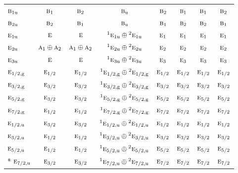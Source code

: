 \documentclass[10pt,a4paper]{article}
\numberwithin{equation}{section}
\newcommand{\irr}[1]{\text{\normalfont\scshape #1}}
\newcommand{\conjpair}[1]{{}^{#1}}
\newcommand{\ptag}[1]{\mathrm{#1}}
\begin{document}
{\begin{longtable}{@{}lccccccc@{}}
$\irr{b}_{1\ptag{u}}$ & $\irr{b}_{1}$ & $\irr{b}_{2}$ & $\irr{b}_{\ptag{u}}$ & $\irr{b}_{2}$ & $\irr{b}_{1}$ & $\irr{b}_{1}$ & $\irr{b}_{2}$\\
$\irr{b}_{2\ptag{u}}$ & $\irr{b}_{2}$ & $\irr{b}_{1}$ & $\irr{b}_{\ptag{u}}$ & $\irr{b}_{1}$ & $\irr{b}_{2}$ & $\irr{b}_{2}$ & $\irr{b}_{1}$\\
$\irr{e}_{1\ptag{u}}$ & $\irr{e}$ & $\irr{e}$ & $\conjpair{1}\irr{e}_{1\ptag{u}}\oplus \conjpair{2}\irr{e}_{1\ptag{u}}$ & $\irr{e}_{1}$ & $\irr{e}_{1}$ & $\irr{e}_{1}$ & $\irr{e}_{1}$\\
$\irr{e}_{2\ptag{u}}$ & $\irr{a}_{1}\oplus \irr{a}_{2}$ & $\irr{a}_{1}\oplus \irr{a}_{2}$ & $\conjpair{1}\irr{e}_{2\ptag{u}}\oplus \conjpair{2}\irr{e}_{2\ptag{u}}$ & $\irr{e}_{2}$ & $\irr{e}_{2}$ & $\irr{e}_{2}$ & $\irr{e}_{2}$\\
$\irr{e}_{3\ptag{u}}$ & $\irr{e}$ & $\irr{e}$ & $\conjpair{1}\irr{e}_{3\ptag{u}}\oplus \conjpair{2}\irr{e}_{3\ptag{u}}$ & $\irr{e}_{3}$ & $\irr{e}_{3}$ & $\irr{e}_{3}$ & $\irr{e}_{3}$\\
$\irr{e}_{1/2,\ptag{g}}$ & $\irr{e}_{1/2}$ & $\irr{e}_{1/2}$ & $\conjpair{1}\irr{e}_{1/2,\ptag{g}}\oplus \conjpair{2}\irr{e}_{1/2,\ptag{g}}$ & $\irr{e}_{1/2}$ & $\irr{e}_{1/2}$ & $\irr{e}_{1/2}$ & $\irr{e}_{1/2}$\\
$\irr{e}_{3/2,\ptag{g}}$ & $\irr{e}_{3/2}$ & $\irr{e}_{3/2}$ & $\conjpair{1}\irr{e}_{3/2,\ptag{g}}\oplus \conjpair{2}\irr{e}_{3/2,\ptag{g}}$ & $\irr{e}_{3/2}$ & $\irr{e}_{3/2}$ & $\irr{e}_{3/2}$ & $\irr{e}_{3/2}$\\
$\irr{e}_{5/2,\ptag{g}}$ & $\irr{e}_{3/2}$ & $\irr{e}_{3/2}$ & $\conjpair{1}\irr{e}_{5/2,\ptag{g}}\oplus \conjpair{2}\irr{e}_{5/2,\ptag{g}}$ & $\irr{e}_{5/2}$ & $\irr{e}_{5/2}$ & $\irr{e}_{5/2}$ & $\irr{e}_{5/2}$\\
$\irr{e}_{7/2,\ptag{g}}$ & $\irr{e}_{1/2}$ & $\irr{e}_{1/2}$ & $\conjpair{1}\irr{e}_{7/2,\ptag{g}}\oplus \conjpair{2}\irr{e}_{7/2,\ptag{g}}$ & $\irr{e}_{7/2}$ & $\irr{e}_{7/2}$ & $\irr{e}_{7/2}$ & $\irr{e}_{7/2}$\\
$\irr{e}_{1/2,\ptag{u}}$ & $\irr{e}_{3/2}$ & $\irr{e}_{3/2}$ & $\conjpair{1}\irr{e}_{1/2,\ptag{u}}\oplus \conjpair{2}\irr{e}_{1/2,\ptag{u}}$ & $\irr{e}_{1/2}$ & $\irr{e}_{1/2}$ & $\irr{e}_{1/2}$ & $\irr{e}_{1/2}$\\
$\irr{e}_{3/2,\ptag{u}}$ & $\irr{e}_{1/2}$ & $\irr{e}_{1/2}$ & $\conjpair{1}\irr{e}_{3/2,\ptag{u}}\oplus \conjpair{2}\irr{e}_{3/2,\ptag{u}}$ & $\irr{e}_{3/2}$ & $\irr{e}_{3/2}$ & $\irr{e}_{3/2}$ & $\irr{e}_{3/2}$\\
$\irr{e}_{5/2,\ptag{u}}$ & $\irr{e}_{1/2}$ & $\irr{e}_{1/2}$ & $\conjpair{1}\irr{e}_{5/2,\ptag{u}}\oplus \conjpair{2}\irr{e}_{5/2,\ptag{u}}$ & $\irr{e}_{5/2}$ & $\irr{e}_{5/2}$ & $\irr{e}_{5/2}$ & $\irr{e}_{5/2}$\\*
$\irr{e}_{7/2,\ptag{u}}$ & $\irr{e}_{3/2}$ & $\irr{e}_{3/2}$ & $\conjpair{1}\irr{e}_{7/2,\ptag{u}}\oplus \conjpair{2}\irr{e}_{7/2,\ptag{u}}$ & $\irr{e}_{7/2}$ & $\irr{e}_{7/2}$ & $\irr{e}_{7/2}$ & $\irr{e}_{7/2}$\\
\bottomrule\end{longtable}}
\end{document}
